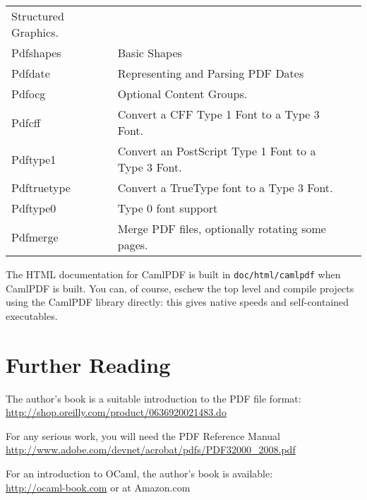 \documentclass[a4paper]{memoir}
\newcommand{\smallgap}{\vspace{4mm}}
\begin{document}
{\begin{tabular}{lp{10cm}l}
Structured Graphics. & \\
Pdfshapes &
Basic Shapes & \\
Pdfdate &
Representing and Parsing PDF Dates & \\
Pdfocg &
Optional Content Groups. & \\
Pdfcff &
Convert a CFF Type 1 Font to a Type 3 Font. & \\
Pdftype1 &
Convert an PostScript Type 1 Font to a Type 3 Font. & \\
Pdftruetype &
Convert a TrueType font to a Type 3 Font. & \\
Pdftype0 &
Type 0 font support & \\
Pdfmerge &
Merge PDF files, optionally rotating some pages. 
 \end{tabular}
}

\smallgap
\noindent The HTML documentation for CamlPDF is built in \texttt{doc/html/camlpdf} when \textsf{CamlPDF} is built. You can, of course, eschew the top level and compile projects using the CamlPDF library directly: this gives native speeds and self-contained executables.

\smallgap

\section*{Further Reading}
The author's book is a suitable introduction to the PDF file format:\\
\url{http://shop.oreilly.com/product/0636920021483.do}

\vspace{4mm}

\noindent For any serious work, you will need the PDF Reference Manual\\
\url{http://www.adobe.com/devnet/acrobat/pdfs/PDF32000_2008.pdf}

\vspace{4mm}

\noindent For an introduction to OCaml, the author's book is available:\\
\url{http://ocaml-book.com} or at Amazon.com

\backmatter
\printindex
\end{document}
